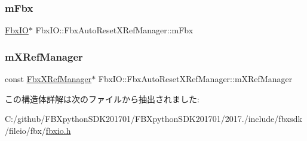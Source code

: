 \subsubsection{\texorpdfstring{m\+Fbx}{mFbx}}
{\footnotesize\ttfamily \hyperlink{class_fbx_i_o}{Fbx\+IO}$\ast$ Fbx\+I\+O\+::\+Fbx\+Auto\+Reset\+X\+Ref\+Manager\+::m\+Fbx}

\mbox{\label{struct_fbx_i_o_1_1_fbx_auto_reset_x_ref_manager_a65b41fef18ebe8d10db3dafe69cca132}} 
\subsubsection{\texorpdfstring{m\+X\+Ref\+Manager}{mXRefManager}}
{\footnotesize\ttfamily const \hyperlink{class_fbx_x_ref_manager}{Fbx\+X\+Ref\+Manager}$\ast$ Fbx\+I\+O\+::\+Fbx\+Auto\+Reset\+X\+Ref\+Manager\+::m\+X\+Ref\+Manager}



この構造体詳解は次のファイルから抽出されました\+:\begin{DoxyCompactItemize}
\item 
C\+:/github/\+F\+B\+Xpython\+S\+D\+K201701/\+F\+B\+Xpython\+S\+D\+K201701/2017./include/fbxsdk/fileio/fbx/\hyperlink{fbxio_8h}{fbxio.\+h}\end{DoxyCompactItemize}

